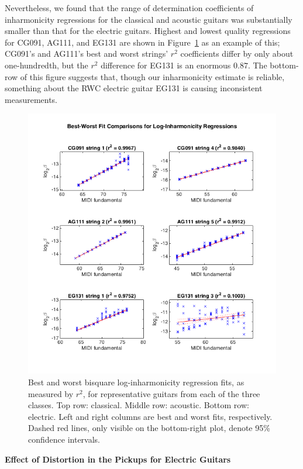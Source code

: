 \documentclass[12pt]{cmuthesis}
\begin{document}
Nevertheless, we found that the range of determination coefficients of inharmonicity regressions for the classical and acoustic guitars was substantially smaller than that for the electric guitars. Highest and lowest quality regressions for CG091, AG111, and EG131 are shown in Figure~\ref{fig:best-worst-r2} as an example of this; CG091's and AG111's best and worst strings' $r^2$ coefficients differ by only about one-hundredth, but the $r^2$ difference for EG131 is an enormous $0.87$. The bottom-row of this figure suggests that, though our inharmonicity estimate is reliable, something about the RWC electric guitar EG131 is causing inconsistent measurements.

\begin{figure}[!htbp] 
\centering
\includegraphics[scale=0.75]{best-worst-r2}
\caption{Best and worst bisquare log-inharmonicity regression fits, as measured by $r^2$, for representative guitars from each of the three classes. Top row: classical. Middle row: acoustic. Bottom row: electric. Left and right columns are best and worst fits, respectively. Dashed red lines, only visible on the bottom-right plot, denote 95\% confidence intervals.}
\label{fig:best-worst-r2}
\end{figure}

\textbf{Effect of Distortion in the Pickups for Electric Guitars}
\end{document}
